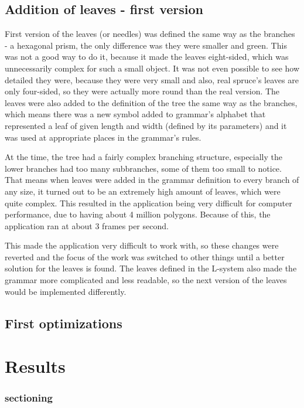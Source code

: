 \documentclass[
  digital, %
  table,   %
  nolof,     %
  nolot,     %
]{fithesis3}
\begin{document}
\section{Addition of leaves - first version}
First version of the leaves (or needles) was defined the same way as the branches - a hexagonal prism, the only difference was they were smaller and green. This was not a good way to do it, because it made the leaves eight-sided, which was unnecessarily complex for such a small object. It was not even possible to see how detailed they were, because they were very small and also, real spruce's leaves are only four-sided, so they were actually more round than the real version. The leaves were also added to the definition of the tree the same way as the branches, which means there was a new symbol added to grammar's alphabet that represented a leaf of given length and width (defined by its parameters) and it was used at appropriate places in the grammar's rules. \par
At the time, the tree had a fairly complex branching structure, especially the lower branches had too many subbranches, some of them too small to notice. That means when leaves were added in the grammar definition to every branch of any size, it turned out to be an extremely high amount of leaves, which were quite complex. This resulted in the application being very difficult for computer performance, due to having about 4 million polygons. Because of this, the application ran at about 3 frames per second. \par
This made the application very difficult to work with, so these changes were reverted and the focus of the work was switched to other things until a better solution for the leaves is found. The leaves defined in the L-system also made the grammar more complicated and less readable, so the next version of the leaves would be implemented differently.
\section{First optimizations}




\chapter{Results}



\iffalse
\subsection{sectioning}
\end{document}
